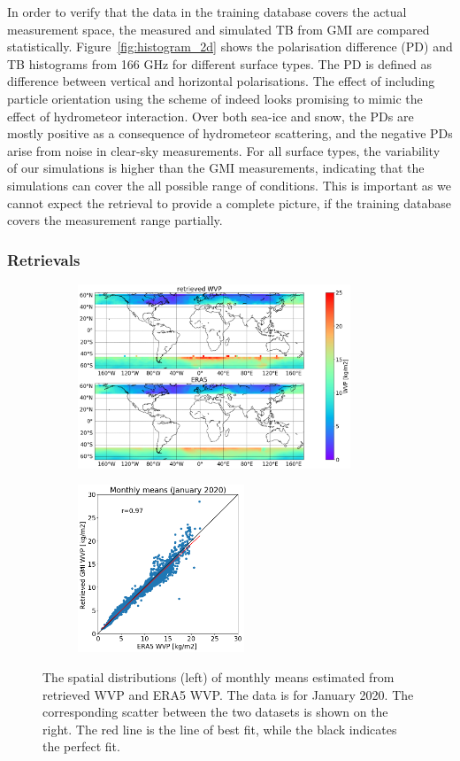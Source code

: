\documentclass[12pt,oneside,a4paper]{article}
\begin{document}
In order to verify that the data in the training database covers the actual measurement space, the measured and simulated TB from GMI are compared statistically. Figure~\ref{fig:histogram_2d} shows the polarisation difference (PD) and TB histograms from 166 GHz for different surface types. The PD is defined as difference between vertical and horizontal polarisations. The effect of including particle orientation using the scheme of \citep{baralakas:intro:21} indeed looks promising to mimic the effect of hydrometeor interaction.
Over both sea-ice and snow, the PDs are mostly positive as a consequence of hydrometeor scattering, and the negative PDs arise from noise in clear-sky measurements. For all surface types, the variability of our simulations is higher than the GMI measurements, indicating that the simulations can cover the all possible range of conditions. This is important as we cannot expect the retrieval to provide a complete picture, if the training database covers the measurement range partially.

\subsubsection{Retrievals}

\begin{figure}[t]
	\centering
	\begin{subfigure}{.54\textwidth}
		\includegraphics[height = 55mm]{Figures/WVP_spatial_jan2020.png}
	\end{subfigure}
	\begin{subfigure}{.34\textwidth}
	\includegraphics[height = 50mm]{Figures/WVP_scatter_monthlymean.png} 
	\end{subfigure}
	\caption{The spatial distributions (left) of monthly means estimated from retrieved WVP and ERA5 WVP. The data is for January 2020. The corresponding scatter between the two datasets is shown on the right. The red line is the line of best fit, while the black indicates the perfect fit.}
	\label{fig:WVP_retrievals}
\end{figure}
\end{document}
